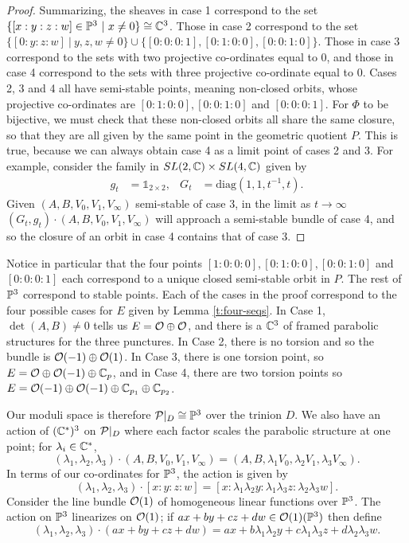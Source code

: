 \begin{proof}
		Summarizing, the sheaves in case 1 correspond to the set $\{[x:y:z:w]\in \mathbb{P}^3~|~ x\neq 0\} \cong \mathbb{C}^3$. Those in case 2 correspond to the set $\{[0:y:z:w]~|~ y,z,w\neq 0\}\cup \{[0:0:0:1],[0:1:0:0],[0:0:1:0]\}$. Those in case 3 correspond to the sets with two projective co-ordinates equal to 0, and those in case 4 correspond to the sets with three projective co-ordinate equal to 0. Cases 2, 3 and 4 all have semi-stable points, meaning non-closed orbits, whose projective co-ordinates are $[0:1:0:0], [0:0:1:0]$ and $[0:0:0:1]$. For $\Phi$ to be bijective, we must check that these non-closed orbits all share the same closure, so that they are all given by the same point in the geometric quotient $P$. This is true, because we can always obtain case 4 as a limit point of cases 2 and 3. For example, consider the family in $SL(2,\mathbb{C})\times SL(4,\mathbb{C})$ given by
		\begin{align*}
			g_t &= \mathds{1}_{2\times 2}, & G_t &= \text{diag}(1, 1, t^{-1}, t).
		\end{align*}
		Given $(A,B,V_0,V_1,V_\infty)$ semi-stable of case 3, in the limit as $t\to \infty$  $(G_t,g_t)\cdot (A,B,V_0,V_1,V_\infty)$ will approach a semi-stable bundle of case 4, and so the closure of an orbit in case 4 contains that of case 3. 
	\end{proof}
	Notice in particular that the four points $[1:0:0:0], [0:1:0:0], [0:0:1:0]$ and $[0:0:0:1]$ each correspond to a unique closed semi-stable orbit in $P$. The rest of $\mathbb{P}^3$ correspond to stable points. Each of the cases in the proof correspond to the four possible cases for $E$ given by Lemma \ref{t:four-seqs}. In Case 1, $\det(A,B)\neq 0$ tells us $E = \mathcal{O}\oplus \mathcal{O}$, and there is a $\mathbb{C}^3$ of framed parabolic structures for the three punctures. In Case 2, there is no torsion and so the bundle is $\mathcal{O}(-1)\oplus \mathcal{O}(1)$. In Case 3, there is one torsion point, so $E = \mathcal{O}\oplus \mathcal{O}(-1)\oplus \mathbb{C}_p$, and in Case 4, there are two torsion points so $E = \mathcal{O}(-1)\oplus \mathcal{O}(-1)\oplus \mathbb{C}_{p_1}\oplus \mathbb{C}_{p_2}$. 
	
	Our moduli space is therefore $\mathcal{P}|_D \cong \mathbb{P}^3$ over the trinion $D$. We also have an action of $(\mathbb{C}^\ast)^3$ on $\mathcal{P}|_D$ where each factor scales the parabolic structure at one point; for $\lambda_i\in \mathbb{C}^\ast$,
	\begin{equation}
		(\lambda_1,\lambda_2,\lambda_3)\cdot (A,B,V_0,V_1,V_\infty) = (A,B,\lambda_1 V_0, \lambda_2 V_1, \lambda_3 V_\infty).
	\end{equation}
	In terms of our co-ordinates for $\mathbb{P}^3$, the action is given by
	\begin{equation}
		\label{e:action-on-p3}
		(\lambda_1, \lambda_2,\lambda_3)\cdot [x:y:z:w] = [x:\lambda_1\lambda_2 y: \lambda_1\lambda_3 z: \lambda_2\lambda_3 w].
	\end{equation}
	Consider the line bundle $\mathcal{O}(1)$ of homogeneous linear functions over $\mathbb{P}^3$. The action on $\mathbb{P}^3$ linearizes on $\mathcal{O}(1)$; if $ax+by+cz+dw \in \mathcal{O}(1)(\mathbb{P}^3)$ then define
	\begin{equation}
	(\lambda_1, \lambda_2,\lambda_3) \cdot (ax+by+cz+dw) = ax +b\lambda_1\lambda_2 y + c\lambda_1\lambda_3 z + d\lambda_2\lambda_3 w. 
	\end{equation}
	
